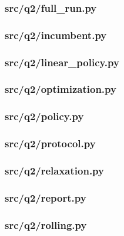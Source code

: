 \documentclass[zihao=-4,a4paper,UTF8,fontset=none]{ctexart}
\begin{document}
\subsubsection*{src/q2/full\_run.py}


\subsubsection*{src/q2/incumbent.py}


\subsubsection*{src/q2/linear\_policy.py}


\subsubsection*{src/q2/optimization.py}


\subsubsection*{src/q2/policy.py}


\subsubsection*{src/q2/protocol.py}


\subsubsection*{src/q2/relaxation.py}


\subsubsection*{src/q2/report.py}


\subsubsection*{src/q2/rolling.py}

\end{document}
